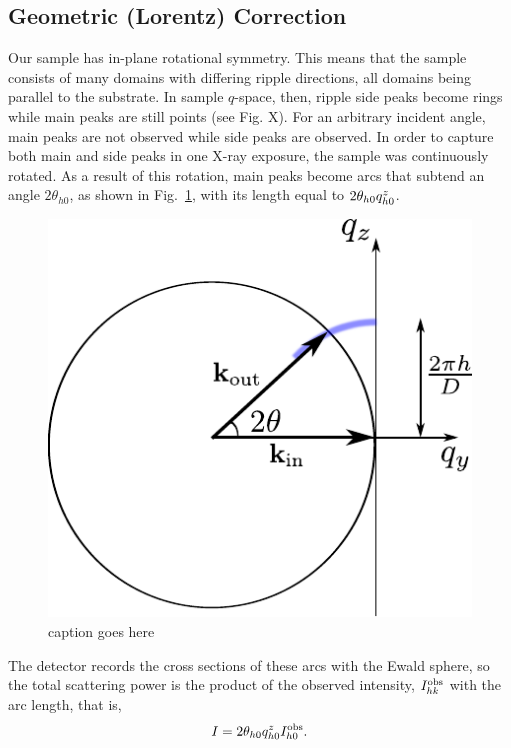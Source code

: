 \subsection{Geometric (Lorentz) Correction}\label{sec:Lorentz_correction}
Our sample has in-plane rotational symmetry. This means that the sample 
consists of many domains with differing ripple directions, all domains
being parallel to the substrate.  
In sample $q$-space, then, ripple side peaks become rings while main peaks are
still points (see Fig. X). For an arbitrary incident angle, main peaks are not observed
while side peaks are observed. 
In order to capture both main and side peaks in one X-ray exposure, 
the sample was continuously rotated. As a result of this rotation, 
main peaks become arcs that subtend an angle $2\theta_{h0}$,
as shown in Fig.~\ref{fig:ewald_main}, with its length
equal to $2\theta_{h0}q_{h0}^z$.  
\begin{figure}[htbp]
  \centering
  \includegraphics[scale=1]{figures/ripple/ewald_main}
  \caption{caption goes here}
  \label{fig:ewald_main}
\end{figure}
The detector records the cross sections of these arcs with the 
Ewald sphere, so the total scattering power is the product of the observed intensity,
$I_{hk}^\mathrm{obs}$ with the arc length, that is, 
\begin{equation}
  I = 2\theta_{h0}q_{h0}^z I_{h0}^\mathrm{obs}. \label{eq:main_ewald}
\end{equation}

